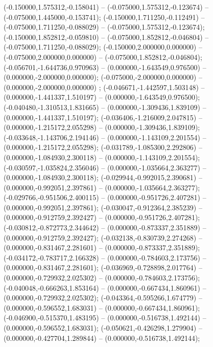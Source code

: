  (-0.150000,1.575312,-0.158041) -- (-0.075000,1.575312,-0.123674) -- (-0.075000,1.445000,-0.153741);
 (-0.150000,1.711250,-0.112491) -- (-0.075000,1.711250,-0.088029) -- (-0.075000,1.575312,-0.123674);
 (-0.150000,1.852812,-0.059810) -- (-0.075000,1.852812,-0.046804) -- (-0.075000,1.711250,-0.088029);
 (-0.150000,2.000000,0.000000) -- (-0.075000,2.000000,0.000000) -- (-0.075000,1.852812,-0.046804);
 (-0.056701,-1.644736,0.970963) -- (0.000000,-1.643549,0.976500) -- (0.000000,-2.000000,0.000000);
 (-0.075000,-2.000000,0.000000) -- (0.000000,-2.000000,0.000000) ;
 (-0.046671,-1.442597,1.503148) -- (0.000000,-1.441337,1.510197) -- (0.000000,-1.643549,0.976500);
 (-0.040480,-1.310513,1.831665) -- (0.000000,-1.309436,1.839109) -- (0.000000,-1.441337,1.510197);
 (-0.036406,-1.216009,2.047815) -- (0.000000,-1.215172,2.055298) -- (0.000000,-1.309436,1.839109);
 (-0.033648,-1.143706,2.194146) -- (0.000000,-1.143109,2.201554) -- (0.000000,-1.215172,2.055298);
 (-0.031789,-1.085300,2.292806) -- (0.000000,-1.084930,2.300118) -- (0.000000,-1.143109,2.201554);
 (-0.030597,-1.035824,2.356046) -- (0.000000,-1.035664,2.363277) -- (0.000000,-1.084930,2.300118);
 (-0.029944,-0.992015,2.390681) -- (0.000000,-0.992051,2.397861) -- (0.000000,-1.035664,2.363277);
 (-0.029766,-0.951506,2.400115) -- (0.000000,-0.951726,2.407281) -- (0.000000,-0.992051,2.397861);
 (-0.030047,-0.912364,2.385239) -- (0.000000,-0.912759,2.392427) -- (0.000000,-0.951726,2.407281);
 (-0.030812,-0.872773,2.344642) -- (0.000000,-0.873337,2.351889) -- (0.000000,-0.912759,2.392427);
 (-0.032138,-0.830739,2.274268) -- (0.000000,-0.831467,2.281601) -- (0.000000,-0.873337,2.351889);
 (-0.034172,-0.783717,2.166328) -- (0.000000,-0.784603,2.173756) -- (0.000000,-0.831467,2.281601);
 (-0.036969,-0.728898,2.017764) -- (0.000000,-0.729932,2.025302) -- (0.000000,-0.784603,2.173756);
 (-0.040048,-0.666263,1.853164) -- (0.000000,-0.667434,1.860961) -- (0.000000,-0.729932,2.025302);
 (-0.043364,-0.595266,1.674779) -- (0.000000,-0.596552,1.683031) -- (0.000000,-0.667434,1.860961);
 (-0.046900,-0.515370,1.483195) -- (0.000000,-0.516738,1.492144) -- (0.000000,-0.596552,1.683031);
 (-0.050621,-0.426298,1.279904) -- (0.000000,-0.427704,1.289844) -- (0.000000,-0.516738,1.492144);
